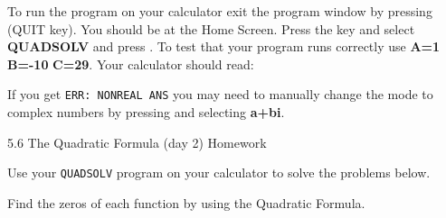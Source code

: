 \documentclass{report}
\theoremstyle{definition}
\begin{document}
\vspace{-0.25cm}

\noindent To run the program on your calculator exit the program window by pressing    (QUIT key). You should be at the Home Screen. Press the  key and select \textbf{QUADSOLV} and press . To test that your program runs correctly use \textbf{A=1} \textbf{B=-10} \textbf{C=29}. Your calculator should read:

\begin{center}
\end{center}

\noindent If you get \texttt{ERR: NONREAL ANS} you may need to manually change the mode to complex numbers by pressing  and selecting \textbf{a+bi}.

 \newpage

\noindent \Large 5.6 The Quadratic Formula (day 2) Homework \normalsize

\noindent Use your \texttt{QUADSOLV} program on your calculator to solve the problems below. 


\noindent Find the zeros of each function by using the Quadratic Formula.
\end{document}
